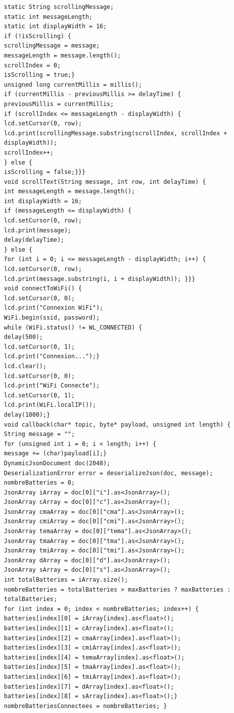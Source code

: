 \begin{lstlisting}[caption=Code de monitoring des batteries]
static String scrollingMessage;
static int messageLength;
static int displayWidth = 16;
if (!isScrolling) {
scrollingMessage = message;
messageLength = message.length();
scrollIndex = 0;
isScrolling = true;}
unsigned long currentMillis = millis();
if (currentMillis - previousMillis >= delayTime) {
previousMillis = currentMillis;
if (scrollIndex <= messageLength - displayWidth) {
lcd.setCursor(0, row);
lcd.print(scrollingMessage.substring(scrollIndex, scrollIndex + displayWidth));
scrollIndex++;
} else {
isScrolling = false;}}}
void scrollText(String message, int row, int delayTime) {
int messageLength = message.length();
int displayWidth = 16; 
if (messageLength <= displayWidth) {
lcd.setCursor(0, row);
lcd.print(message);
delay(delayTime);
} else {
for (int i = 0; i <= messageLength - displayWidth; i++) { 
lcd.setCursor(0, row);
lcd.print(message.substring(i, i + displayWidth)); }}}
void connectToWiFi() {
lcd.setCursor(0, 0);
lcd.print("Connexion WiFi");
WiFi.begin(ssid, password);
while (WiFi.status() != WL_CONNECTED) {
delay(500);
lcd.setCursor(0, 1);
lcd.print("Connexion...");}
lcd.clear();
lcd.setCursor(0, 0);
lcd.print("WiFi Connecte");
lcd.setCursor(0, 1);
lcd.print(WiFi.localIP());
delay(1000);}
void callback(char* topic, byte* payload, unsigned int length) {
String message = "";
for (unsigned int i = 0; i < length; i++) {
message += (char)payload[i];}
DynamicJsonDocument doc(2048); 
DeserializationError error = deserializeJson(doc, message);
nombreBatteries = 0;
JsonArray iArray = doc[0]["i"].as<JsonArray>();
JsonArray cArray = doc[0]["c"].as<JsonArray>();
JsonArray cmaArray = doc[0]["cma"].as<JsonArray>();
JsonArray cmiArray = doc[0]["cmi"].as<JsonArray>();
JsonArray temaArray = doc[0]["tema"].as<JsonArray>();
JsonArray tmaArray = doc[0]["tma"].as<JsonArray>();
JsonArray tmiArray = doc[0]["tmi"].as<JsonArray>();
JsonArray dArray = doc[0]["d"].as<JsonArray>();
JsonArray sArray = doc[0]["s"].as<JsonArray>();
int totalBatteries = iArray.size();
nombreBatteries = totalBatteries > maxBatteries ? maxBatteries : totalBatteries;
for (int index = 0; index < nombreBatteries; index++) {
batteries[index][0] = iArray[index].as<float>();
batteries[index][1] = cArray[index].as<float>();
batteries[index][2] = cmaArray[index].as<float>();
batteries[index][3] = cmiArray[index].as<float>();
batteries[index][4] = temaArray[index].as<float>();
batteries[index][5] = tmaArray[index].as<float>();
batteries[index][6] = tmiArray[index].as<float>();
batteries[index][7] = dArray[index].as<float>();
batteries[index][8] = sArray[index].as<float>();}
nombreBatteriesConnectees = nombreBatteries; }

\end{lstlisting}
